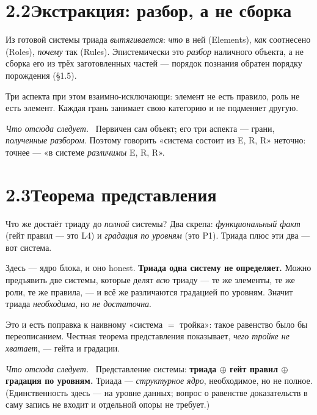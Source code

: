 \documentclass[12pt,a4paper]{article}
\newcommand{\rezultat}{\medskip\noindent\emph{Что отсюда следует.}\ }
\begin{document}
\section*{2.2\quad Экстракция: разбор, а не сборка}

Из готовой системы триада \emph{вытягивается}: \emph{что} в ней (Elements), \emph{как} соотнесено
(Roles), \emph{почему} так (Rules). Эпистемически это \emph{разбор} наличного объекта, а не сборка
его из трёх заготовленных частей --- порядок познания обратен порядку порождения (§1.5).

Три аспекта при этом взаимно-исключающи: элемент не есть правило, роль не есть элемент. Каждая
грань занимает свою категорию и не подменяет другую.

\rezultat
Первичен сам объект; его три аспекта --- грани, \emph{полученные разбором}. Поэтому говорить
«система состоит из E, R, R» неточно: точнее --- «в системе \emph{различимы} E, R, R».

\section*{2.3\quad Теорема представления}

Что же достаёт триаду до \emph{полной} системы? Два скрепа: \emph{функциональный факт} (гейт
правил --- это L4) и \emph{градация по уровням} (это P1). Триада плюс эти два --- вот система.

Здесь --- ядро блока, и оно honest. \textbf{Триада одна систему не определяет.} Можно предъявить
две системы, которые делят \emph{всю} триаду --- те же элементы, те же роли, те же правила, --- и
всё же различаются градацией по уровням. Значит триада \emph{необходима}, но \emph{не достаточна}.

Это и есть поправка к наивному «система $=$ тройка»: такое равенство было бы переописанием.
Честная теорема представления показывает, \emph{чего тройке не хватает}, --- гейта и градации.

\rezultat
Представление системы: \textbf{триада $\oplus$ гейт правил $\oplus$ градация по уровням.} Триада ---
\emph{структурное ядро}, необходимое, но не полное. (Единственность здесь --- на уровне данных;
вопрос о равенстве доказательств в саму запись не входит и отдельной опоры не требует.)
\end{document}
